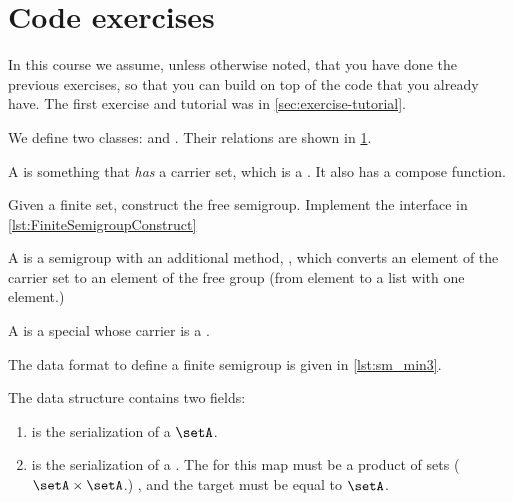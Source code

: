\section{\usebox{\chaptergear}
  Code exercises}

\begin{remark}
    In this course we assume, unless otherwise noted, that you have done the previous exercises, so that you can build on top of the code that you already have.
    The first exercise and tutorial was in \cref{sec:exercise-tutorial}.
\end{remark}

\begin{figure*}[b]
    \label{fig:uml_semigroup}
\end{figure*}

We define two classes: \Semigroup and \FiniteSemigroup.
Their relations are shown in \cref{fig:uml_semigroup}.

A \Semigroup is something that \emph{has} a carrier set, which is a \Setoid.
It also has a compose function.


\begin{codeexercise}
    \label{ex:TestFiniteSemigroupConstruct}
    Given a finite set, construct the free semigroup.
    Implement the interface in \cref{lst:FiniteSemigroupConstruct}
\end{codeexercise}


A \FreeSemigroup is a semigroup with an additional method, , which converts an element of the carrier set to an element of the free group (\eg from element to a list with one element.)


A \FiniteSemigroup is a special \Semigroup whose carrier is a \FiniteSet.


The data format to define a finite semigroup is given in \cref{lst:sm_min3}.

The data structure contains two fields:
\begin{enumerate}
    \item {} is the serialization of a \FiniteSet $\setA$.
    \item {} is the serialization of a \FiniteMap.
          The 
          for this map must be a product of sets ($\setA \times \setA$.)
          , and the target must be equal to $\setA$.
\end{enumerate}

